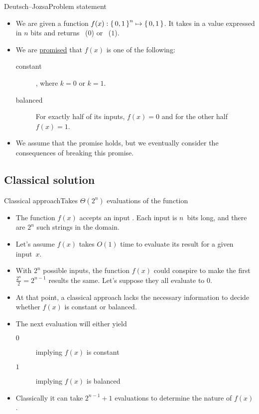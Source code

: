 \begin{frame}{Deutsch--Jozsa}{Problem statement}
\begin{itemize}[<+->]
    \item We are given a function $f(x): \left\{\,0,1\,\right\}^{n}\mapsto \left\{\,0,1\,\right\}$.  It takes in a value expressed in $n$ bits and returns \False{}~($0$) or \True~($1$).
    \item We are \href{https://en.wikipedia.org/wiki/Promise_problem}{promised} that $f(x)$ is one of the following:
    \begin{description}
        \item[constant]  , where $k=0$ or $k=1$.
        \item[balanced]  For exactly half of its inputs, $f(x) = 0$ and for the other half $f(x) = 1$.
    \end{description}
    \item We assume that the promise holds, but we eventually consider the consequences of breaking this promise.
\end{itemize}
\end{frame}

\subsection*{Classical solution}

\begin{frame}{Classical approach}{Takes $\Theta(2^{n})$ evaluations of the function}

\begin{itemize}[<+->]
    \item The function $f(x)$ accepts an input .  Each input is $n$~bits long, and there are $2^n$ such strings in the domain.
    \item Let's assume $f(x)$ takes $O(1)$ time
    to evaluate its result for a given input~$x$.
    \item With $2^{n}$ possible inputs, the function $f(x)$ could conspire to make the first $\frac{2^n}{2}=2^{n-1}$ results the same.  Let's suppose they all evaluate to $0$.
    \item At that point, a classical approach lacks the necessary information to decide whether $f(x)$ is constant or balanced.
    \item The next evaluation will either yield
    \begin{description}
      \item[$0$] implying $f(x)$ is constant
      \item[$1$] implying $f(x)$ is balanced
    \end{description}
    \item Classically it can take $2^{n-1}+1$ evaluations to determine the nature of $f(x)$.
\end{itemize}
    
\end{frame}

